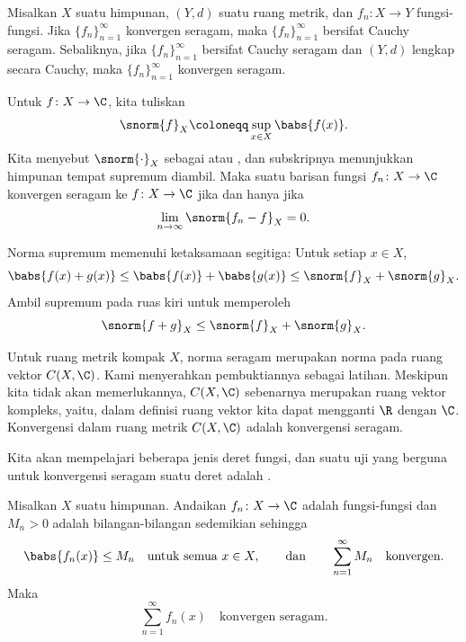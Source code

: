 \begin{prop} \label{prop:unifcauchymetric}
Misalkan $X$ suatu himpunan, $(Y,d)$ suatu ruang metrik, dan
$f_n \colon X \to Y$ fungsi-fungsi.
Jika $\{ f_n \}_{n=1}^\infty$ konvergen seragam,
maka $\{f_n\}_{n=1}^\infty$ bersifat Cauchy seragam. Sebaliknya, jika
$\{f_n\}_{n=1}^\infty$ bersifat Cauchy seragam dan $(Y,d)$ lengkap secara Cauchy,
maka $\{f_n\}_{n=1}^\infty$ konvergen seragam.
\end{prop}

Untuk $f \colon X \to \C$, kita tuliskan
\begin{equation*}
\snorm{f}_X \coloneqq \sup_{x \in X} \babs{f(x)} .
\end{equation*}
Kita menyebut $\snorm{\cdot}_X$
sebagai \emph{} atau \emph{},
dan subskripnya menunjukkan himpunan tempat supremum diambil.
Maka suatu barisan fungsi
$f_n \colon X \to \C$ konvergen seragam ke $f \colon X \to \C$ jika dan hanya jika
\begin{equation*}
\lim_{n\to \infty} \snorm{f_n-f}_X = 0 .
\end{equation*}

Norma supremum memenuhi ketaksamaan segitiga: Untuk setiap $x \in X$,
\begin{equation*}
\babs{f(x)+g(x)} \leq
\babs{f(x)}+\babs{g(x)} \leq
\snorm{f}_X+\snorm{g}_X .
\end{equation*}
Ambil supremum pada ruas kiri untuk memperoleh
\begin{equation*}
\snorm{f+g}_X \leq
\snorm{f}_X+\snorm{g}_X .
\end{equation*}

Untuk ruang metrik kompak $X$,
norma seragam merupakan norma pada ruang vektor $C(X,\C)$.
Kami menyerahkan pembuktiannya sebagai latihan.
Meskipun kita tidak akan memerlukannya, $C(X,\C)$ sebenarnya merupakan ruang
vektor kompleks, yaitu, dalam definisi ruang vektor kita dapat mengganti
$\R$ dengan $\C$.
Konvergensi dalam ruang metrik $C(X,\C)$ adalah
konvergensi seragam.

Kita akan mempelajari beberapa jenis deret fungsi, dan
suatu uji yang berguna untuk konvergensi seragam suatu deret adalah
\emph{}.

\begin{thm} \label{thm:weiermtest}
Misalkan $X$ suatu himpunan.
Andaikan $f_n \colon X \to \C$ adalah fungsi-fungsi dan $M_n > 0$ adalah bilangan-bilangan sedemikian
sehingga
\begin{equation*}
\babs{f_n(x)}\leq M_n \quad \text{untuk semua } x \in X,
\qquad \text{dan} \qquad
\sum_{n=1}^\infty M_n
\quad \text{konvergen}.
\end{equation*}
Maka
\begin{equation*}
\sum_{n=1}^\infty f_n(x)
\quad \text{konvergen seragam}.
\end{equation*}
\end{thm}


